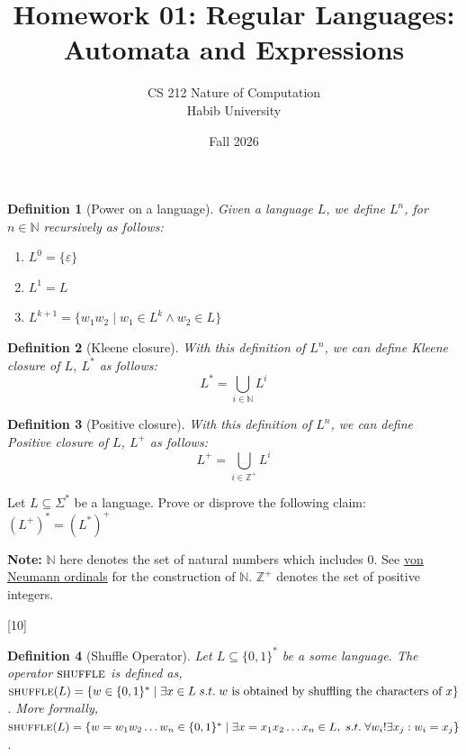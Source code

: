 \documentclass[a4paper]{exam}
\title{Homework 01: Regular Languages: Automata and Expressions}
\author{CS 212 Nature of Computation\\Habib University\\
}
\date{Fall 2026}
\newcommand{\shuffle}{\textsc{shuffle}} %
\newtheorem{definition}{Definition}
\begin{document}
\maketitle


\begin{questions}
    \question[10]
    \begin{definition}[Power on a language]
        Given a language $L$, we define $L^n$, for $n \in \mathbb{N}$ recursively as follows:
        \begin{enumerate}
            \item $L^0 = \{\varepsilon\}$ 
            \item $L^1 = L$
            \item $L^{k+1} = \{w_1w_2\mid w_1 \in L^k \land w_2 \in L\}$
        \end{enumerate}
    \end{definition}
    \begin{definition}[Kleene closure]
        With this definition of $L^n$, we can define Kleene closure of $L$, $L^*$ as follows:
        $$L^*=\bigcup_{i \in \mathbb{N}} L^i$$
    \end{definition}
    \begin{definition}[Positive closure]
        With this definition of $L^n$, we can define Positive closure of $L$, $L^+$ as follows:
        $$L^+=\bigcup_{i \in \mathbb{Z}^+} L^i$$
    \end{definition}
    
    Let $L \subseteq \Sigma^*$ be a language. Prove or disprove the following claim:
    $(L^+)^*=(L^*)^+$
    
    \begin{solution}
    \end{solution}
    
    \textbf{Note:} $\mathbb{N}$ here denotes the set of natural numbers which includes 0. See \href{https://en.wikipedia.org/wiki/Set-theoretic_definition_of_natural_numbers}{von Neumann ordinals} for the construction of $\mathbb{N}$.
    $\mathbb{Z}^+$ denotes the set of positive integers.

    [10]

    \begin{definition}[Shuffle Operator]
        Let $L \subseteq \{0,1\}^*$ be a some language. The operator $\shuffle$ is defined as, $\shuffle(L) = \{w\in \{0,1\}^*\mid \exists x \in L \;s.t. \; w \text{ is obtained by shuffling the characters of } x\}$. More formally, $\shuffle(L) = \{w = w_1w_2\dots w_n\in \{0,1\}^*\mid \exists x = x_1x_2 \dots x_n \in L, \;s.t.\; \forall w_i !\exists x_j : w_i = x_j\}$. 
    \end{definition}
    

\end{questions}
\end{document}
